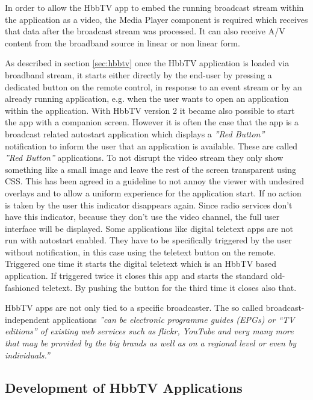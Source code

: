 In order to allow the HbbTV app to embed the running broadcast stream within the application
as a video, the Media Player component is required which receives that data after the broadcast
stream was processed. It can also receive A/V content from the broadband source in linear or non
linear form.

As described in section \ref{sec:hbbtv} once the HbbTV application is loaded via broadband stream,
it starts either directly by the end-user by pressing a dedicated button on the remote control, in
response to an event stream or by an already running application, e.g. when the user wants to open
an application within the application. With HbbTV version 2 it became also possible to start the
app with a companion screen. However it is often the case that the app is a broadcast related
autostart application which displays a \textit{''Red Button''} notification to inform the user
that an application is available. These are called \textit{''Red Button''} applications. To not
disrupt the video stream they only show something like a small image and leave the rest of the
screen transparent using CSS. This has been agreed in a guideline to not annoy the viewer with
undesired overlays and to allow a uniform experience for the application start. If no action
is taken by the user this indicator disappears again. Since radio services don't have this
indicator, because they don't use the video channel, the full user interface will be displayed.
Some applications like digital teletext apps are not run with autostart enabled. They have
to be specifically triggered by the user without notification, in this case using the teletext
button on the remote. Triggered one time it starts the digital teletext which is an HbbTV based
application. If triggered twice it closes this app and starts the standard old-fashioned teletext.
By pushing the button for the third time it closes also that.

HbbTV apps are not only tied to a specific broadcaster. The so called broadcast-independent
applications \textit{''can be electronic programme guides (EPGs) or “TV editions” of existing
web services such as flickr, YouTube and very many more that may be provided by the big brands
as well as on a regional level or even by individuals.''}\cite{biapps}

\subsection{Development of HbbTV Applications\label{sec:devofhbbtv}}

